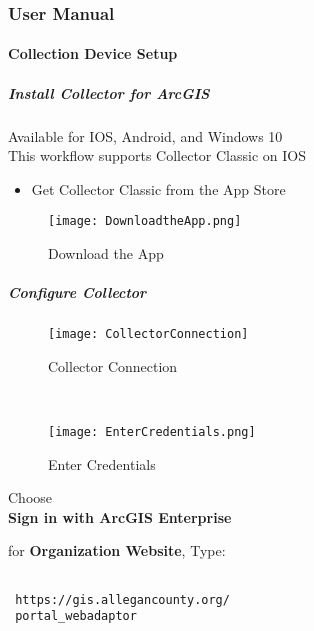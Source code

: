   
  \clearpage
  \subsubsection[User Manual]{\Large User Manual}
  \paragraph{Collection Device Setup}
  \subparagraph{Install Collector for ArcGIS}
	\noindent Available for IOS, Android, and Windows 10\\
	\noindent This workflow supports Collector Classic on IOS
  \begin{itemize}
  \item Get Collector Classic from the App Store
  \end{itemize}
  \begin{figure}[h!]
  \centering
      \texttt{[image: DownloadtheApp.png]}
  \caption{Download the App}
  \end{figure}
  \clearpage
  \subparagraph[Configure Collector]{\Large Configure Collector}
  \begin{wrapfigure}{r}{0.5\textwidth}
  \centering
  \texttt{[image: CollectorConnection]}
  \caption{Collector Connection}

  \HRule \\[.4cm] %
  \vspace{.1in}

      \texttt{[image: EnterCredentials.png]}
  \vspace{-.1in}

  \caption{Enter Credentials}
  \end{wrapfigure}

  Choose\\
  \noindent \textbf{Sign in with ArcGIS Enterprise}
  
 \vspace{.25in}
  
 for \textbf{Organization Website}, Type:
  
 \vspace{.1in}

 \begin{verbatim}

 https://gis.allegancounty.org/
 portal_webadaptor

 \end{verbatim}

